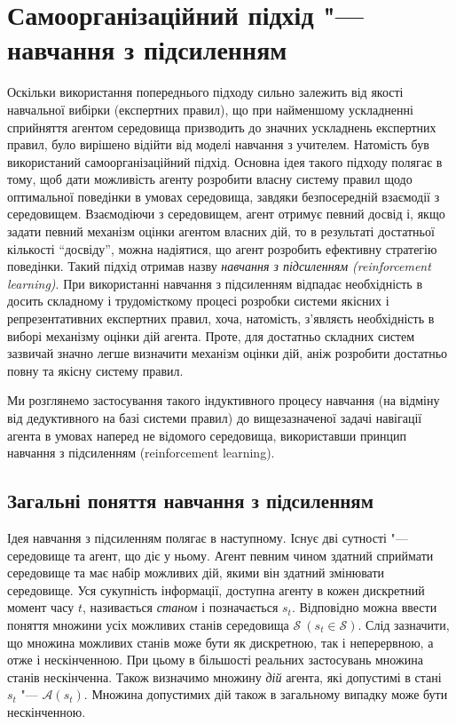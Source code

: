 \documentclass[a4paper,10pt]{article}
\begin{document}
\section{Самоорганізаційний підхід "--- навчання з підсиленням}

Оскільки використання попереднього підходу сильно залежить від якості навчальної вибірки (експертних правил), що при найменшому ускладненні сприйняття агентом середовища призводить до значних ускладнень експертних правил, було вирішено відійти від моделі навчання з учителем. Натомість був використаний самоорганізаційний підхід. Основна ідея такого підходу полягає в тому, щоб дати можливість агенту розробити власну систему правил щодо оптимальної поведінки в умовах середовища, завдяки безпосередній взаємодії з середовищем. Взаємодіючи з середовищем, агент отримує певний досвід і, якщо задати певний механізм оцінки агентом власних дій, то в результаті достатньої кількості ``досвіду'', можна надіятися, що агент розробить ефективну стратегію поведінки. Такий підхід отримав назву \emph{навчання з підсиленням (reinforcement learning)}. При використанні навчання з підсиленням відпадає необхідність в досить складному і трудомісткому процесі розробки системи якісних і репрезентативних експертних правил, хоча, натомість, з'являєть необхідність в виборі механізму оцінки дій агента. Проте, для достатньо складних систем зазвичай значно легше визначити механізм оцінки дій, аніж розробити достатньо повну та якісну систему правил.

Ми розглянемо застосування такого індуктивного процесу навчання (на відміну від дедуктивного на базі системи правил) до вищезазначеної задачі навігації агента в умовах наперед не відомого середовища, використавши принцип навчання з підсиленням (reinforcement learning).

\subsection{Загальні поняття навчання з підсиленням}

Ідея навчання з підсиленням полягає в наступному. Існує дві сутності "--- середовище та агент, що діє у ньому. Агент певним чином здатний сприймати середовище та має набір можливих дій, якими він здатний змінювати середовище. Уся сукупність інформації, доступна агенту в кожен дискретний момент часу $t$, називається \emph{станом} і позначається $s_t$. Відповідно можна ввести поняття множини усіх можливих станів середовища $\mathcal{S}\ (s_t \in \mathcal{S})$. Слід зазначити, що множина можливих станів може бути як дискретною, так і неперервною, а отже і нескінченною. При цьому в більшості реальних застосувань множина станів нескінченна. Також визначимо множину \emph{дій} агента, які допустимі в стані $s_t$ "--- $\mathcal{A}(s_t)$. Множина допустимих дій також в загальному випадку може бути нескінченною.
\end{document}

